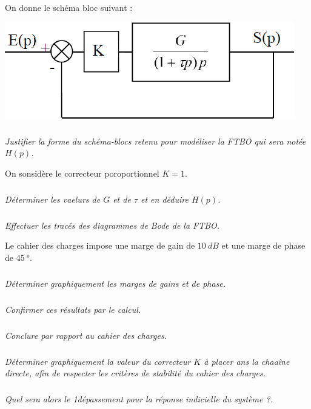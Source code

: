 \documentclass[10pt,fleqn]{article} %
\begin{document}
\begin{multicols}{2}
On donne le schéma bloc suivant :

\begin{center}
\includegraphics[width=\linewidth]{images/fig_02}
\end{center}

\subparagraph{}\textit{Justifier la forme du schéma-blocs retenu pour modéliser la FTBO qui sera notée $H(p)$.}

On sonsidère le correcteur poroportionnel $K=1$. 
\subparagraph{}\textit{Déterminer les vaelurs de $G$ et de $\tau$ et en déduire $H(p)$.}


\subparagraph{}\textit{Effectuer les tracés des diagrammes de Bode de la FTBO.}

Le cahier des charges impose une marge de gain de $\SI{10}{dB}$ et une marge de phase de $
\SI{45}{\degree}$.

\subparagraph{}\textit{Déterminer graphiquement les marges de gains et de phase.}
\subparagraph{}\textit{Confirmer ces résultats par le calcul.}
\subparagraph{}\textit{Conclure par rapport au cahier des charges.}
\subparagraph{}\textit{Déterminer graphiquement la valeur du correcteur $K$ à placer ans la chaaîne directe, afin de respecter les critères de stabilité du cahier des charges.}

\subparagraph{}\textit{Quel sera alors le 1\ier dépassement pour la réponse indicielle du système ?.}

\end{multicols}
%
%
%
\end{document}
